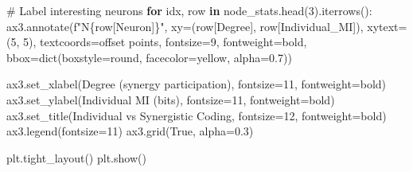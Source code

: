 \documentclass[
  11pt,
  letterpaper,
  oneside,
  openany]{book}
\newenvironment{Shaded}{\begin{snugshade}}{\end{snugshade}}
\newcommand{\BuiltInTok}[1]{\textcolor[rgb]{0.00,0.23,0.31}{#1}}
\newcommand{\CommentTok}[1]{\textcolor[rgb]{0.37,0.37,0.37}{#1}}
\newcommand{\ControlFlowTok}[1]{\textcolor[rgb]{0.00,0.23,0.31}{\textbf{#1}}}
\newcommand{\DecValTok}[1]{\textcolor[rgb]{0.68,0.00,0.00}{#1}}
\newcommand{\FloatTok}[1]{\textcolor[rgb]{0.68,0.00,0.00}{#1}}
\newcommand{\KeywordTok}[1]{\textcolor[rgb]{0.00,0.23,0.31}{\textbf{#1}}}
\newcommand{\NormalTok}[1]{\textcolor[rgb]{0.00,0.23,0.31}{#1}}
\newcommand{\OperatorTok}[1]{\textcolor[rgb]{0.37,0.37,0.37}{#1}}
\newcommand{\SpecialCharTok}[1]{\textcolor[rgb]{0.37,0.37,0.37}{#1}}
\newcommand{\SpecialStringTok}[1]{\textcolor[rgb]{0.13,0.47,0.30}{#1}}
\newcommand{\StringTok}[1]{\textcolor[rgb]{0.13,0.47,0.30}{#1}}
\newcommand{\VariableTok}[1]{\textcolor[rgb]{0.07,0.07,0.07}{#1}}
\begin{document}
\begin{Shaded}
\begin{Highlighting}[]
\CommentTok{\# Label interesting neurons}
\ControlFlowTok{for}\NormalTok{ idx, row }\KeywordTok{in}\NormalTok{ node\_stats.head(}\DecValTok{3}\NormalTok{).iterrows():}
\NormalTok{    ax3.annotate(}\SpecialStringTok{f"N}\SpecialCharTok{\{}\NormalTok{row[}\StringTok{\textquotesingle{}Neuron\textquotesingle{}}\NormalTok{]}\SpecialCharTok{\}}\SpecialStringTok{"}\NormalTok{, }
\NormalTok{                xy}\OperatorTok{=}\NormalTok{(row[}\StringTok{\textquotesingle{}Degree\textquotesingle{}}\NormalTok{], row[}\StringTok{\textquotesingle{}Individual\_MI\textquotesingle{}}\NormalTok{]),}
\NormalTok{                xytext}\OperatorTok{=}\NormalTok{(}\DecValTok{5}\NormalTok{, }\DecValTok{5}\NormalTok{), textcoords}\OperatorTok{=}\StringTok{\textquotesingle{}offset points\textquotesingle{}}\NormalTok{,}
\NormalTok{                fontsize}\OperatorTok{=}\DecValTok{9}\NormalTok{, fontweight}\OperatorTok{=}\StringTok{\textquotesingle{}bold\textquotesingle{}}\NormalTok{,}
\NormalTok{                bbox}\OperatorTok{=}\BuiltInTok{dict}\NormalTok{(boxstyle}\OperatorTok{=}\StringTok{\textquotesingle{}round\textquotesingle{}}\NormalTok{, facecolor}\OperatorTok{=}\StringTok{\textquotesingle{}yellow\textquotesingle{}}\NormalTok{, alpha}\OperatorTok{=}\FloatTok{0.7}\NormalTok{))}

\NormalTok{ax3.set\_xlabel(}\StringTok{\textquotesingle{}Degree (synergy participation)\textquotesingle{}}\NormalTok{, fontsize}\OperatorTok{=}\DecValTok{11}\NormalTok{, fontweight}\OperatorTok{=}\StringTok{\textquotesingle{}bold\textquotesingle{}}\NormalTok{)}
\NormalTok{ax3.set\_ylabel(}\StringTok{\textquotesingle{}Individual MI (bits)\textquotesingle{}}\NormalTok{, fontsize}\OperatorTok{=}\DecValTok{11}\NormalTok{, fontweight}\OperatorTok{=}\StringTok{\textquotesingle{}bold\textquotesingle{}}\NormalTok{)}
\NormalTok{ax3.set\_title(}\StringTok{\textquotesingle{}Individual vs Synergistic Coding\textquotesingle{}}\NormalTok{, fontsize}\OperatorTok{=}\DecValTok{12}\NormalTok{, fontweight}\OperatorTok{=}\StringTok{\textquotesingle{}bold\textquotesingle{}}\NormalTok{)}
\NormalTok{ax3.legend(fontsize}\OperatorTok{=}\DecValTok{11}\NormalTok{)}
\NormalTok{ax3.grid(}\VariableTok{True}\NormalTok{, alpha}\OperatorTok{=}\FloatTok{0.3}\NormalTok{)}

\NormalTok{plt.tight\_layout()}
\NormalTok{plt.show()}


\end{Highlighting}
\end{Shaded}
\end{document}
